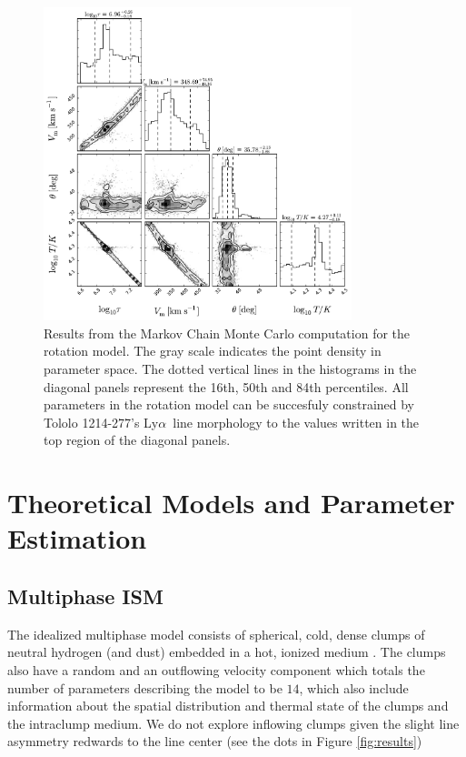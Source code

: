 \documentclass[a4,useAMS,usenatbib,usegraphicx]{mn2e}
\newcommand{\tol}{Tololo 1214-277}
\newcommand{\lya}{Ly$\alpha$}
\begin{document}
\begin{figure}
\begin{center}
\includegraphics[width=0.8\textwidth]{emcee_results.pdf}
\caption{Results from the Markov Chain Monte Carlo computation for
    the rotation model. 
    The gray scale indicates the point density in parameter space. 
    The dotted vertical lines in the histograms in the diagonal panels
    represent the 16th, 50th and 84th percentiles. 
    All parameters in the rotation model can be succesfuly constrained by \tol's
    \lya\ line morphology to the values written in the top region of
    the diagonal panels.
    \label{emceeresults}} 
\end{center}
\end{figure}


\section{Theoretical Models and Parameter Estimation}


\subsection{Multiphase ISM} 

The idealized multiphase model consists of spherical, cold, dense
clumps of neutral hydrogen (and dust) embedded in a hot, ionized
medium \citep{Gronke2016}. 
The clumps also have a random and an outflowing velocity
component which totals the number of parameters describing the model
to be $14$, which also include information about the spatial
distribution and thermal state of the clumps and the intraclump
medium. 
We do not explore inflowing clumps given the slight line asymmetry
redwards to the line center (see the dots in Figure \ref{fig:results})
\end{document}
